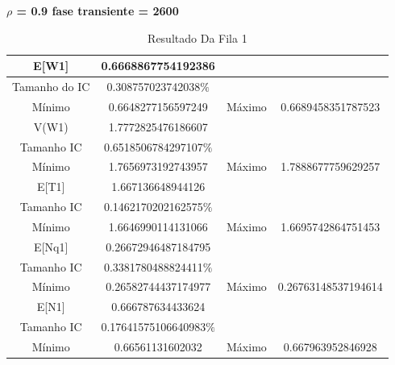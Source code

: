 \documentclass[a4paper,10pt]{article}
\begin{document}
      \textbf{$\rho$ = 0.9 fase transiente = 2600}
      \begin{table}[H] 
		  \centering
		  \begin{tabular}{|c|c|c|c|}
		        \hline
			 E[W1]         & 0.6668867754192386     &        &                        \\ \hline
			 Tamanho do IC & 0.308757023742038$\%$  & 	 & 		         \\ \hline
			 Mínimo        & 0.6648277156597249     & Máximo & 0.6689458351787523     \\ \hline
			 V(W1)         & 1.7772825476186607     &	 &		         \\ \hline	
			 Tamanho IC    & 0.6518506784297107$\%$ &	 &		         \\ \hline
			 Mínimo        & 1.7656973192743957     & Máximo & 1.7888677759629257	 \\ \hline
			 E[T1]         & 1.667136648944126      &	 &		         \\ \hline	
			 Tamanho IC    & 0.1462170202162575$\%$ &	 &		         \\ \hline
			 Mínimo        & 1.6646990114131066     & Máximo & 1.6695742864751453	 \\ \hline
			 E[Nq1]        & 0.26672946487184795    &	 &		         \\ \hline	
			 Tamanho IC    & 0.3381780488824411$\%$ &	 &		         \\ \hline
			 Mínimo        & 0.26582744437174977    & Máximo & 0.26763148537194614	 \\ \hline
			 E[N1]         & 0.666787634433624      &	 &		         \\ \hline	
			 Tamanho IC    & 0.17641575106640983$\%$&	 &		         \\ \hline
			 Mínimo        & 0.66561131602032       & Máximo & 0.667963952846928	 \\ \hline
		  \end{tabular}
		  \caption{Resultado Da Fila 1} 
	    \end{table}
\end{document}
